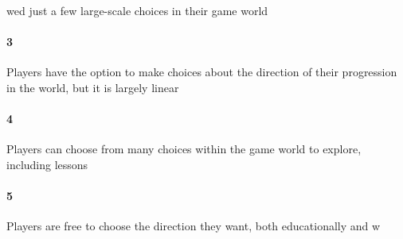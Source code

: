 wed just a few large-scale choices in their game world\paragraph{3}Players have the option to make choices about the direction of their progression in the world, but it is largely linear\paragraph{4}Players can choose from many choices within the game world to explore, including lessons\paragraph{5}Players are free to choose the direction they want, both educationally and w
